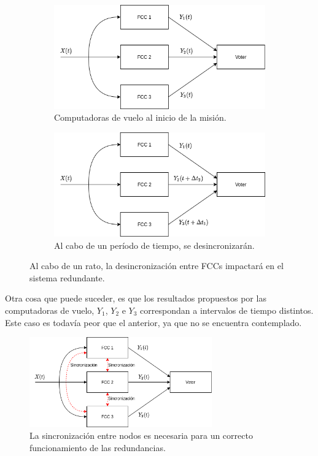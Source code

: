 \begin{figure}[H]
    \centering
    \begin{subfigure}[b]{0.49\textwidth}
        \includegraphics[width=\textwidth]{img/3_4_1_sincronizacion_1.png}
        \caption{Computadoras de vuelo al inicio de la misión.}
        \label{fig:3_4_1_sincronizacion_1}
    \end{subfigure}
    \begin{subfigure}[b]{0.49\textwidth}
        \includegraphics[width=\textwidth]{img/3_4_1_sincronizacion_2.png}
        \caption{Al cabo de un período de tiempo, se desincronizarán.}
        \label{fig:3_4_1_sincronizacion_2}
    \end{subfigure}
    \caption{Al cabo de un rato, la desincronización entre FCCs impactará en el sistema redundante.}
    \label{fig:3_4_1_sincronizacion}
\end{figure}

Otra cosa que puede suceder, es que los resultados propuestos por las computadoras de vuelo, $Y_1$, $Y_2$ e $Y_3$ correspondan a intervalos de tiempo distintos. Este caso es todavía peor que el anterior, ya que no se encuentra contemplado. 

\begin{figure}[H]
    \centering
    \includegraphics[width=0.7\textwidth]{img/3_4_1_sincronizacion_3.png}
    \caption{La sincronización entre nodos es necesaria para un correcto funcionamiento de las redundancias.}
    \label{fig:3_4_1_sincronizacion_3}
\end{figure}

